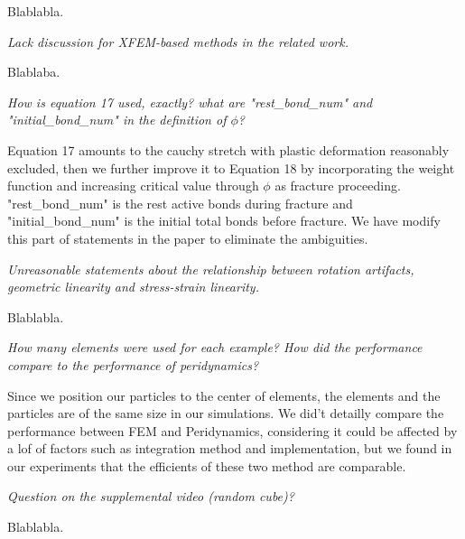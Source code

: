Blablabla.

\emph{Lack discussion for XFEM-based methods in the related work.}

Blablaba.

\emph{How is equation 17 used, exactly? what are "rest\_bond\_num" and "initial\_bond\_num" in the definition of $\phi$?}

Equation 17 amounts to the cauchy stretch with plastic deformation reasonably excluded, then we further improve it to Equation 18 by incorporating the weight function and increasing critical value through $\phi$ as fracture proceeding. "rest\_bond\_num" is the rest active bonds during fracture and "initial\_bond\_num" is the initial total bonds before fracture. We have modify this part of statements in the paper to eliminate the ambiguities.

\emph{Unreasonable statements about the relationship between rotation artifacts, geometric linearity and stress-strain linearity.}

Blablabla.

\emph{How many elements were used for each example? How did the performance compare to the performance of peridynamics?}

Since we position our particles to the center of elements, the elements and the particles are of the same size in our simulations.
We did't detailly compare the performance between FEM and Peridynamics, considering it could be affected by a lof of factors such as integration method and implementation, but we found in our experiments that the efficients of these two method are comparable.

\emph{Question on the supplemental video (random cube)?}

Blablabla.


%





